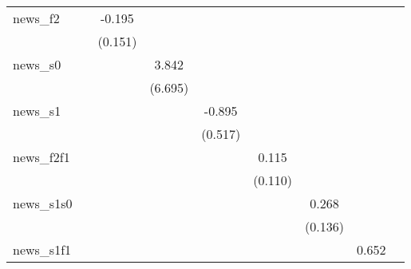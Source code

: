 {\begin{tabular}{l*{8}{c}}
\addlinespace
news\_f2     &                     &      -0.195         &                     &                     &                     &                     &                     &                     \\
            &                     &     (0.151)         &                     &                     &                     &                     &                     &                     \\
\addlinespace
news\_s0     &                     &                     &       3.842         &                     &                     &                     &                     &                     \\
            &                     &                     &     (6.695)         &                     &                     &                     &                     &                     \\
\addlinespace
news\_s1     &                     &                     &                     &      -0.895\sym{*}  &                     &                     &                     &                     \\
            &                     &                     &                     &     (0.517)         &                     &                     &                     &                     \\
\addlinespace
news\_f2f1   &                     &                     &                     &                     &       0.115         &                     &                     &                     \\
            &                     &                     &                     &                     &     (0.110)         &                     &                     &                     \\
\addlinespace
news\_s1s0   &                     &                     &                     &                     &                     &       0.268\sym{**} &                     &                     \\
            &                     &                     &                     &                     &                     &     (0.136)         &                     &                     \\
\addlinespace
news\_s1f1   &                     &                     &                     &                     &                     &                     &       0.652         &                     \\

\end{tabular}}
